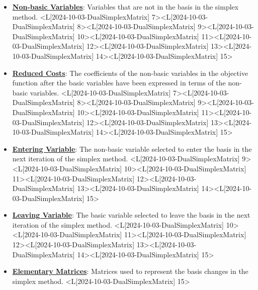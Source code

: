 \documentclass{article}%
\begin{document}
\begin{itemize}[[leftmargin=*]]
\item \href{https://www.math.purdue.edu/~yipn/421/2024-10-03-DualSimplexMatrix.pdf#page=7}{\textbf{Non{-}basic Variables}}: Variables that are not in the basis in the simplex method. <L[2024-10-03-DualSimplexMatrix] 7><L[2024-10-03-DualSimplexMatrix] 8><L[2024-10-03-DualSimplexMatrix] 9><L[2024-10-03-DualSimplexMatrix] 10><L[2024-10-03-DualSimplexMatrix] 11><L[2024-10-03-DualSimplexMatrix] 12><L[2024-10-03-DualSimplexMatrix] 13><L[2024-10-03-DualSimplexMatrix] 14><L[2024-10-03-DualSimplexMatrix] 15>%
\item \href{https://www.math.purdue.edu/~yipn/421/2024-10-03-DualSimplexMatrix.pdf#page=7}{\textbf{Reduced Costs}}: The coefficients of the non-basic variables in the objective function after the basic variables have been expressed in terms of the non-basic variables. <L[2024-10-03-DualSimplexMatrix] 7><L[2024-10-03-DualSimplexMatrix] 8><L[2024-10-03-DualSimplexMatrix] 9><L[2024-10-03-DualSimplexMatrix] 10><L[2024-10-03-DualSimplexMatrix] 11><L[2024-10-03-DualSimplexMatrix] 12><L[2024-10-03-DualSimplexMatrix] 13><L[2024-10-03-DualSimplexMatrix] 14><L[2024-10-03-DualSimplexMatrix] 15>%
\item \href{https://www.math.purdue.edu/~yipn/421/2024-10-03-DualSimplexMatrix.pdf#page=9}{\textbf{Entering Variable}}: The non-basic variable selected to enter the basis in the next iteration of the simplex method. <L[2024-10-03-DualSimplexMatrix] 9><L[2024-10-03-DualSimplexMatrix] 10><L[2024-10-03-DualSimplexMatrix] 11><L[2024-10-03-DualSimplexMatrix] 12><L[2024-10-03-DualSimplexMatrix] 13><L[2024-10-03-DualSimplexMatrix] 14><L[2024-10-03-DualSimplexMatrix] 15>%
\item \href{https://www.math.purdue.edu/~yipn/421/2024-10-03-DualSimplexMatrix.pdf#page=10}{\textbf{Leaving Variable}}: The basic variable selected to leave the basis in the next iteration of the simplex method. <L[2024-10-03-DualSimplexMatrix] 10><L[2024-10-03-DualSimplexMatrix] 11><L[2024-10-03-DualSimplexMatrix] 12><L[2024-10-03-DualSimplexMatrix] 13><L[2024-10-03-DualSimplexMatrix] 14><L[2024-10-03-DualSimplexMatrix] 15>%
\item \href{https://www.math.purdue.edu/~yipn/421/2024-10-03-DualSimplexMatrix.pdf#page=15}{\textbf{Elementary Matrices}}: Matrices used to represent the basis changes in the simplex method. <L[2024-10-03-DualSimplexMatrix] 15>%
\end{itemize}%
\end{document}

